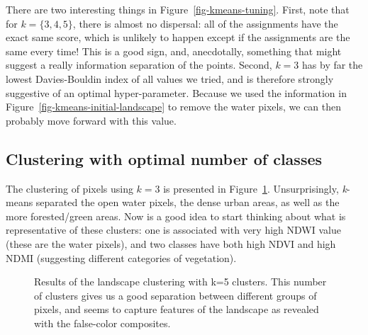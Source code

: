 \documentclass[
  letterpaper,
]{scrbook}
\begin{document}

There are two interesting things in Figure~\ref{fig-kmeans-tuning}.
First, note that for \(k=\{3,4,5\}\), there is almost no dispersal: all
of the assignments have the exact same score, which is unlikely to
happen except if the assignments are the same every time! This is a good
sign, and, anecdotally, something that might suggest a really
information separation of the points. Second, \(k = 3\) has by far the
lowest Davies-Bouldin index of all values we tried, and is therefore
strongly suggestive of an optimal hyper-parameter. Because we used the
information in Figure~\ref{fig-kmeans-initial-landscape} to remove the
water pixels, we can then probably move forward with this value.

\subsection{Clustering with optimal number of
classes}\label{clustering-with-optimal-number-of-classes}

The clustering of pixels using \(k = 3\) is presented in
Figure~\ref{fig-kmeans-optimal-landscape}. Unsurprisingly,
\emph{k}-means separated the open water pixels, the dense urban areas,
as well as the more forested/green areas. Now is a good idea to start
thinking about what is representative of these clusters: one is
associated with very high NDWI value (these are the water pixels), and
two classes have both high NDVI and high NDMI (suggesting different
categories of vegetation).

\begin{figure}[pbt]


\caption{\label{fig-kmeans-optimal-landscape}Results of the landscape
clustering with k=5 clusters. This number of clusters gives us a good
separation between different groups of pixels, and seems to capture
features of the landscape as revealed with the false-color composites.}

\end{figure}%
\end{document}
